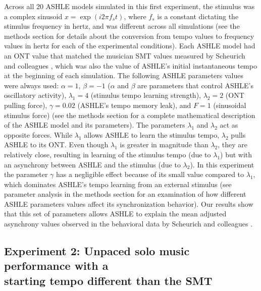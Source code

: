 \documentclass{report}
\begin{document}
Across all 20 ASHLE models simulated in this first experiment, the stimulus was a complex sinusoid $x=\exp(i2\pi f_s t)$, where $f_s$ is a constant dictating the stimulus frequency in hertz, and was different across all simulations (see the methods section for details about the conversion from tempo values to frequency values in hertz for each of the experimental conditions). Each ASHLE model had an ONT value that matched the musician SMT values measured by Scheurich and colleagues \cite{scheurich2018tapping}, which was also the value of ASHLE's initial instantaneous tempo at the beginning of each simulation. The following ASHLE parameters values were always used: $\alpha=1$, $\beta=−1$ ($\alpha$ and $\beta$ are parameters that control ASHLE's oscillatory activity), $\lambda_1=4$ (stimulus tempo learning strength), $\lambda_2=2$ (ONT pulling force), $\gamma=0.02$ (ASHLE's tempo memory leak), and $F=1$ (sinusoidal stimulus force) (see the methods section for a complete mathematical description of the ASHLE model and its parameters). The parameters $\lambda_1$ and $\lambda_2$ act as opposite forces. While $\lambda_1$ allows ASHLE to learn the stimulus tempo, $\lambda_2$ pulls ASHLE to its ONT. Even though $\lambda_1$ is greater in magnitude than $\lambda_2$, they are relatively close, resulting in learning of the stimulus tempo (due to $\lambda_1$) but with an asynchrony between ASHLE and the stimulus (due to $\lambda_2$). In this experiment the parameter $\gamma$ has a negligible effect because of its small value compared to $\lambda_1$, which dominates ASHLE's tempo learning from an external stimulus (see parameter analysis in the methods section for an examination of how different ASHLE parameters values affect its synchronization behavior). Our results show that this set of parameters allows ASHLE to explain the mean adjusted asynchrony values observed in the behavioral data by Scheurich and colleagues \cite{scheurich2018tapping}.

\subsection{Experiment 2: Unpaced solo music performance with a \\ starting tempo different than the SMT}
\end{document}
